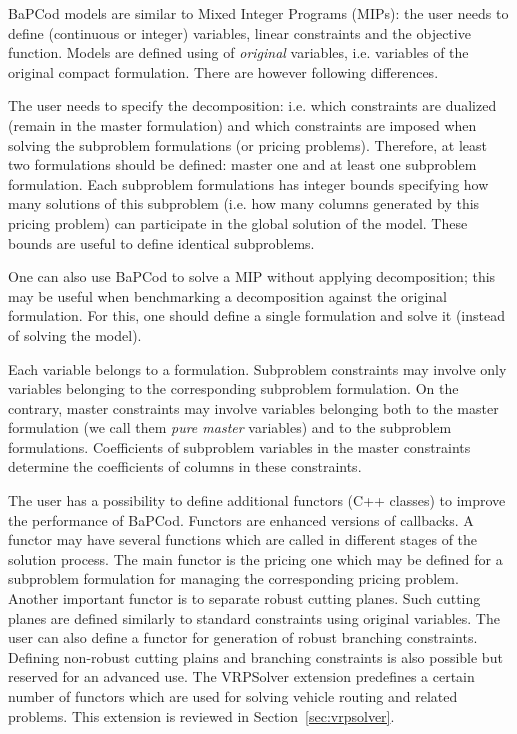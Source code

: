 \documentclass[10pt,a4paper]{article}
\newcommand{\bc}{BaPCod\xspace}
\begin{document}
\bc models are similar to Mixed Integer Programs (MIPs): the user needs to define (continuous or integer) variables,
linear constraints and the objective function. Models are defined using of \emph{original} variables, i.e. variables of
the original compact formulation. There are however following differences.

The user needs to specify the decomposition: i.e. which constraints are dualized (remain in the master formulation) and
which constraints are imposed when solving the subproblem formulations (or pricing problems). Therefore, at least two
formulations should be defined: master one and at least one subproblem formulation. Each
subproblem formulations has integer bounds specifying how many solutions of this subproblem (i.e. how many columns
generated by this pricing problem) can participate in the global solution of the model. These bounds are useful to
define identical subproblems.

One can also use \bc to solve a MIP without applying decomposition; this may be useful when benchmarking a decomposition
against the original formulation. For this, one should define a single formulation and solve it (instead of solving the
model). 

Each variable belongs to a formulation. Subproblem constraints may involve only variables belonging to the corresponding
subproblem formulation. On the contrary, master constraints may involve variables belonging both to the master
formulation (we call them \emph{pure master} variables) and to the subproblem formulations. Coefficients of subproblem
variables in the master constraints determine the coefficients of columns in these constraints. 

The user has a possibility to define additional functors (C++ classes) to improve the performance of \bc. Functors are
enhanced versions of callbacks. A functor may have several functions which are called in different stages of the
solution process. The main functor is the pricing one which may be defined for a subproblem formulation for managing the
corresponding pricing problem. Another important functor is to separate robust cutting planes. Such cutting planes are
defined similarly to standard constraints using original variables. The user can also define a functor for generation of
robust branching constraints. Defining non-robust cutting plains and branching constraints is also possible but reserved
for an advanced use. The VRPSolver extension predefines a certain number of functors which are used for solving
vehicle routing and related problems. This extension is reviewed in Section~\ref{sec:vrpsolver}.
\end{document}
